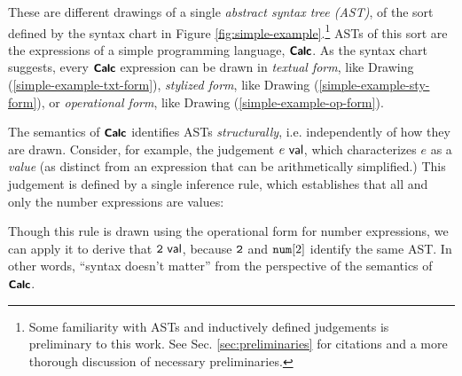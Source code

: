 \noindent
These are different drawings of a single \emph{abstract syntax tree (AST)}, of the sort defined by the syntax chart in Figure \ref{fig:simple-example}.\footnote{Some familiarity with ASTs and inductively defined judgements is preliminary to this work. See Sec. \ref{sec:preliminaries} for citations and a more thorough discussion of necessary preliminaries.} ASTs of this sort are the expressions of a simple programming language, $\simplelang$. 
As the syntax chart suggests, every $\simplelang$ expression can be drawn in \emph{textual form}, like Drawing (\ref{simple-example-txt-form}), \emph{stylized form}, like Drawing (\ref{simple-example-sty-form}), or \emph{operational form}, like Drawing (\ref{simple-example-op-form}).





 The semantics of $\simplelang$ identifies ASTs \emph{structurally}, i.e. independently of how they are drawn. Consider, for example, the judgement $\isvalU{e}$, which characterizes $e$ as a \emph{value} (as distinct from an expression that can be arithmetically simplified.) This judgement is defined by a single inference rule, which establishes that all and only the number expressions are values:
\begin{mathpar}
\end{mathpar}
Though this rule is drawn using the operational form for number expressions, we can apply it to derive that $\isvalU{\numintro{2}}$, because $\numintro{2}$ and $\anumintro{2}$ identify the same AST. In other words, ``syntax doesn't matter'' from the perspective of the semantics of $\simplelang$.


